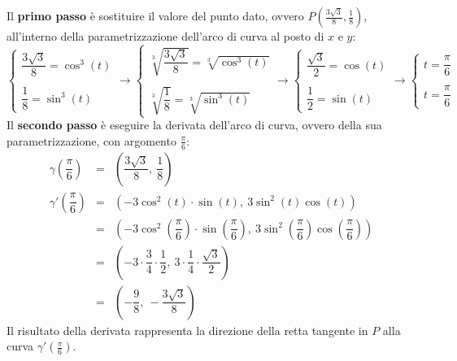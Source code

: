 \documentclass[a4paper]{article}
\begin{document}
	\noindent
	Il \textbf{primo passo} è sostituire il valore del punto dato, ovvero $P\left(\frac{3\sqrt{3}}{8}, \frac{1}{8}\right)$, all'interno della parametrizzazione dell'arco di curva al posto di $x$ e $y$:
	\begin{equation*}
		\begin{cases}
			\dfrac{3\sqrt{3}}{8} = \cos^{3}\left(t\right) \\
			\\
			\dfrac{1}{8} = \sin^{3}\left(t\right)
		\end{cases}
		\rightarrow
		\begin{cases}
			\sqrt[3]{\dfrac{3\sqrt{3}}{8}} = \sqrt[3]{\cos^{3}\left(t\right)} \\
			\\
			\sqrt[3]{\dfrac{1}{8}} = \sqrt[3]{\sin^{3}\left(t\right)}
		\end{cases}
		\rightarrow
		\begin{cases}
			\dfrac{\sqrt{3}}{2} = \cos\left(t\right) \\
			\\
			\dfrac{1}{2} = \sin\left(t\right)
		\end{cases}
		\rightarrow
		\begin{cases}
			t = \dfrac{\pi}{6} \\
			\\
			t = \dfrac{\pi}{6}
		\end{cases}
	\end{equation*}
	Il \textbf{secondo passo} è eseguire la derivata dell'arco di curva, ovvero della sua parametrizzazione, con argomento $\frac{\pi}{6}$:
	\begin{equation*}
		\begin{array}{rcl}
			\gamma\left(\dfrac{\pi}{6}\right) &=& \left(\dfrac{3\sqrt{3}}{8}, \: \dfrac{1}{8}\right) \\ [1em]
			\gamma'\left(\dfrac{\pi}{6}\right) &=& \left(-3 \cos^{2}\left(t\right) \cdot \sin\left(t\right), \: 3 \sin^{2}\left(t\right) \cos\left(t\right)\right) \\ [1em]
			&=& \left(-3 \cos^{2}\left(\dfrac{\pi}{6}\right) \cdot \sin\left(\dfrac{\pi}{6}\right), \: 3 \sin^{2}\left(\dfrac{\pi}{6}\right) \cos\left(\dfrac{\pi}{6}\right)\right) \\ [1em]
			&=& \left(-3 \cdot \dfrac{3}{4} \cdot \dfrac{1}{2}, \: 3 \cdot \dfrac{1}{4} \cdot \dfrac{\sqrt{3}}{2} \right) \\ [1.5em]
			&=& \left(-\dfrac{9}{8}, \: - \dfrac{3\sqrt{3}}{8}\right)
		\end{array}
	\end{equation*}
	Il risultato della derivata rappresenta la direzione della retta tangente in $P$ alla curva $\gamma'\left(\frac{\pi}{6}\right)$.\newline
\end{document}
